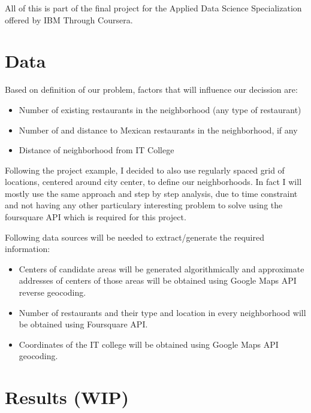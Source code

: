 \documentclass[11pt]{article}
\begin{document}
All of this is part of the final project for the Applied Data Science Specialization offered by IBM Through Coursera.

\citet{Course} %

\section{Data}

Based on definition of our problem, factors that will influence our decission are:
\begin{itemize}
    \item Number of existing restaurants in the neighborhood (any type of restaurant)
    \item Number of and distance to Mexican restaurants in the neighborhood, if any
    \item Distance of neighborhood from IT College
\end{itemize}

Following the project example, I decided to also use regularly spaced grid of locations, centered around city center, to define our neighborhoods. In fact I will mostly use the same approach and step by step analysis, due to time constraint and not having any other particulary interesting problem to solve using the foursquare API which is required for this project.

\citep{CourseExample} %
\newline

Following data sources will be needed to extract/generate the required information:
\begin{itemize}
    \item Centers of candidate areas will be generated algorithmically and approximate addresses of centers of those areas will be obtained using Google Maps API reverse geocoding.
    \item Number of restaurants and their type and location in every neighborhood will be obtained using Foursquare API.
    \item Coordinates of the IT college will be obtained using Google Maps API geocoding.
\end{itemize}

\noindent
\citep{FoursquareAPI}
\newline
\citep{GoogleAPI}

\section{Results (WIP)}
\end{document}
